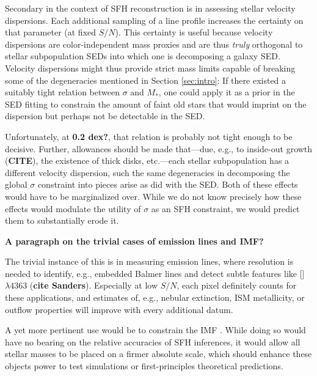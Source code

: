 \documentclass[a4paper,fleqn,usenatbib]{mnras}
\newcommand{\Mstel}{M_\ast}
\newcommand{\bfr}{\bf\color{red}}
\newcommand{\CITE}{{\bfr CITE}}
\begin{document}
Secondary in the context of SFH reconstruction is in assessing stellar velocity dispersions. Each 
additional sampling of a line profile increases the certainty on that parameter (at fixed $S/N$). 
This certainty is useful because velocity dispersions are color-independent mass proxies and are 
thus {\it truly} orthogonal to stellar subpopulation SEDs into which one is decomposing a galaxy SED.
Velocity dispersions might thus provide strict mass limits capable of breaking some of the degeneracies 
mentioned in Section \ref{sec:intro}: If there existed a suitably tight relation between $\sigma$
and $\Mstel$, one could apply it as a prior in the SED fitting to constrain the amount of faint old 
stars that would imprint on the dispersion but perhaps not be detectable in the SED.

Unfortunately, at {\bfr 0.2 dex?}, that relation is probably not tight enough to be decisive. Further,
allowances should be made that---due, e.g., to inside-out growth (\CITE), the existence of thick disks, 
etc.---each stellar subpopulation has a different velocity dispersion, such the same degeneracies in
decomposing the global $\sigma$ constraint into pieces arise as did with the SED. Both of these 
effects would have to be marginalized over. While we do not know precisely how these effects 
would modulate the utility of $\sigma$ as an SFH constraint, we would predict them to 
substantially erode it.

{\bfr A paragraph on the trivial cases of emission lines and IMF?}

The trivial instance of this is in measuring emission lines, where resolution is needed to 
identify, e.g., embedded Balmer lines and detect subtle features like [] 
$\lambda4363$ ({\bfr cite Sanders}). Especially at low $S/N$, each pixel definitely counts
for these applications, and estimates of, e.g., nebular extinction, ISM metallicity, or outflow
properties will improve with every additional datum.

A yet more pertinent use would be to constrain the IMF \citep{Conroy12}. While doing so 
would have no bearing on the relative accuracies of SFH inferences, it would allow all stellar 
masses to be placed on a firmer absolute scale, which should enhance these objects power to test 
simulations or first-principles theoretical predictions. %
\fi
\end{document}
